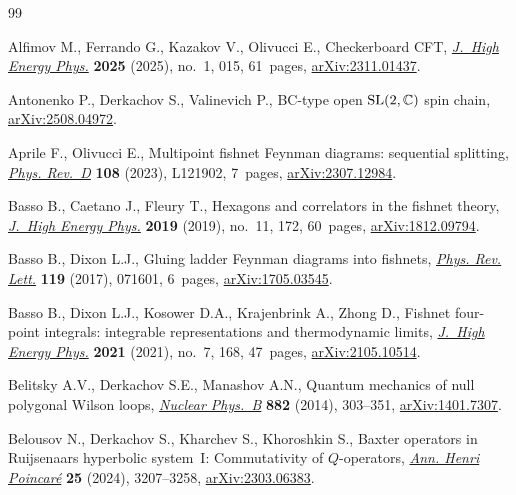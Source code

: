 \begin{thebibliography}{99}
\footnotesize\itemsep=0pt

Alfimov M., Ferrando G., Kazakov V., Olivucci E., Checkerboard {CFT},
 \href{https://doi.org/10.1007/jhep01(2025)015}{\textit{J.~High Energy Phys.}}
 \textbf{2025} (2025), no.~1, 015, 61~pages,
 \href{http://arxiv.org/abs/2311.01437}{arXiv:2311.01437}.

Antonenko P., Derkachov S., Valinevich P., {BC}-type open ${\rm
 SL}(2,\mathbb{C})$ spin chain,
 \href{http://arxiv.org/abs/2508.04972}{arXiv:2508.04972}.

Aprile F., Olivucci E., Multipoint fishnet {F}eynman diagrams: sequential
 splitting, \href{https://doi.org/10.1103/physrevd.108.l121902}{\textit{Phys.
 Rev.~D}} \textbf{108} (2023), L121902, 7~pages,
 \href{http://arxiv.org/abs/2307.12984}{arXiv:2307.12984}.

Basso B., Caetano J., Fleury T., Hexagons and correlators in the fishnet
 theory, \href{https://doi.org/10.1007/jhep11(2019)172}{\textit{J.~High Energy
 Phys.}} \textbf{2019} (2019), no.~11, 172, 60~pages,
 \href{http://arxiv.org/abs/1812.09794}{arXiv:1812.09794}.

Basso B., Dixon L.J., Gluing ladder {F}eynman diagrams into fishnets,
 \href{https://doi.org/10.1103/PhysRevLett.119.071601}{\textit{Phys. Rev.
 Lett.}} \textbf{119} (2017), 071601, 6~pages,
 \href{http://arxiv.org/abs/1705.03545}{arXiv:1705.03545}.

Basso B., Dixon L.J., Kosower D.A., Krajenbrink A., Zhong D., Fishnet
 four-point integrals: integrable representations and thermodynamic limits,
 \href{https://doi.org/10.1007/jhep07(2021)168}{\textit{J.~High Energy Phys.}}
 \textbf{2021} (2021), no.~7, 168, 47~pages,
 \href{http://arxiv.org/abs/2105.10514}{arXiv:2105.10514}.

Belitsky A.V., Derkachov S.E., Manashov A.N., Quantum mechanics of null
 polygonal {W}ilson loops,
 \href{https://doi.org/10.1016/j.nuclphysb.2014.03.007}{\textit{Nuclear
 Phys.~B}} \textbf{882} (2014), 303--351,
 \href{http://arxiv.org/abs/1401.7307}{arXiv:1401.7307}.

Belousov N., Derkachov S., Kharchev S., Khoroshkin S., Baxter operators in
 {R}uijsenaars hyperbolic system~{I}: {C}ommutativity of {$Q$}-operators,
 \href{https://doi.org/10.1007/s00023-023-01364-4}{\textit{Ann. Henri
 Poincar\'e}} \textbf{25} (2024), 3207--3258,
 \href{http://arxiv.org/abs/2303.06383}{arXiv:2303.06383}.


\end{thebibliography}
